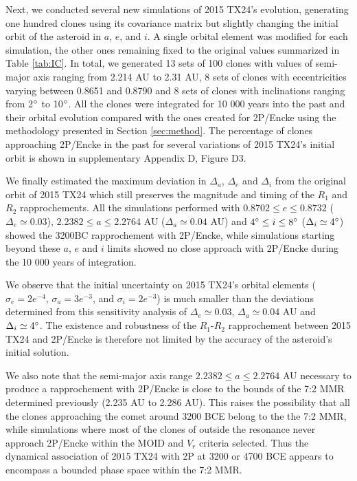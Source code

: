 \documentclass[letters,a4paper,fleqn,usenatbib]{mnras}
\begin{document}
Next, we conducted several new simulations of 2015 TX24's evolution, generating one hundred clones using its covariance matrix but slightly changing the initial orbit of the asteroid in $a$, $e$, and $i$. A single orbital element was modified for each simulation, the other ones remaining fixed to the original values summarized in Table \ref{tab:IC}. In total, we generated 13 sets of 100 clones with values of semi-major axis ranging from 2.214 AU to 2.31 AU,  8 sets of clones with eccentricities varying between 0.8651 and 0.8790 and 8 sets of clones with inclinations ranging from 2$\degree$ to 10$\degree$. All the clones were integrated for 10 000 years into the past and their orbital evolution compared with the ones created for 2P/Encke using the methodology presented in Section \ref{sec:method}. The percentage of clones approaching 2P/Encke in the past for several variations of 2015 TX24's initial orbit is shown in supplementary Appendix D, Figure D3. 
 
 We finally estimated the maximum deviation in $\Delta_a$, $\Delta_e$ and $\Delta_i$ from the original orbit of 2015 TX24 which still preserves the magnitude and timing of the $R_1$ and $R_2$ rapprochements. All the simulations performed with $0.8702\leq e \leq 0.8732$ ($\Delta_e \simeq 0.03$), $2.2382\leq a \leq 2.2764$ AU ($\Delta_a \simeq 0.04$ AU) and $4\degree \leq i \leq 8 \degree$ ($\Delta_i \simeq 4\degree$) showed the 3200BC rapprochement with 2P/Encke, while simulations starting beyond these $a$, $e$ and $i$ limits showed no close approach with 2P/Encke during the 10 000 years of integration.
 
 We observe that the initial uncertainty on 2015 TX24's orbital elements ($\sigma_e=2e^{-4}$, $\sigma_a=3e^{-3}$, and $\sigma_i=2e^{-3}$) is much smaller than the deviations determined from this sensitivity analysis of $\Delta_e \simeq 0.03$, $\Delta_a \simeq 0.04$ AU and $\Delta_i \simeq 4\degree$. The existence and robustness of the  $R_1$-$R_2$ rapprochement between 2015 TX24 and 2P/Encke is therefore not limited by the accuracy of the asteroid's initial solution. 
 
 We also note that the semi-major axis range $2.2382\leq a \leq 2.2764$ AU necessary to produce a rapprochement with 2P/Encke is close to the bounds of the 7:2 MMR determined previously (2.235 AU to 2.286 AU). This raises the possibility that all the clones approaching the comet around 3200 BCE belong to the the 7:2 MMR, while simulations where most of the clones of outside the resonance never approach 2P/Encke within the MOID and $V_r$ criteria selected. Thus the dynamical association of 2015 TX24 with 2P at 3200 or 4700 BCE appears to encompass a bounded phase space within the 7:2 MMR.
\end{document}
